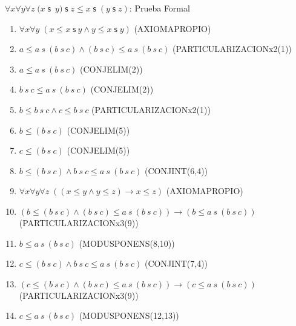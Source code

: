\documentclass[10pt]{beamer}
\newcounter{saveenumi}
\newcommand{\seti}{\setcounter{saveenumi}{\value{enumi}}}
\newcommand{\Cfonta}{\fontsize{6.7}{9.5}\selectfont}
\newcommand{\Nand}{\wedge}
\newcommand{\trans}{\forall x\forall y\forall z\;\left( (x\leq y\wedge
y\leq z)\rightarrow x\leq z\right)}
\newcommand{\sCot}{\forall x\forall y\;(x\leq x\;\mathsf{s}\ y\wedge y\leq x\;\mathsf{s}\;y)}
\newcommand{\assoc}{\forall x\forall y\forall
z\;(x\;\mathsf{s}$\ $y)\;\mathsf{s}\;z\leq x\;\mathsf{s}\;(y\;\mathsf{s}\;z)}
\begin{document}
\begin{frame}{$\assoc$: Prueba Formal}
\Cfonta
  \begin{enumerate}[<+->]
    \item $ \sCot $ \hfill(AXIOMAPROPIO)
    \item $ a \leq a\ s\ (b\ s\ c)\Nand (b\ s\ c)\leq a\ s\ (b\ s\ c) $ \hfill(PARTICULARIZACIONx2(1))
    \item $ a \leq a\ s\ (b\ s\ c)$ \hfill(CONJELIM(2))
    \item $ b\ s\ c \leq a\ s\ (b\ s\ c)$ \hfill(CONJELIM(2))
    \item $ b \leq b\ s\ c \Nand c \leq b\ s\ c $ \hfill(PARTICULARIZACIONx2(1))
    \item $ b \leq (b\ s\ c)$ \hfill(CONJELIM(5))
    \item $ c \leq (b\ s\ c)$ \hfill(CONJELIM(5))
    \item $ b \leq (b\ s\ c) \Nand b\ s\ c \leq a\ s\ (b\ s\ c)$ \hfill(CONJINT(6,4))
    \item $ \trans $ \hfill(AXIOMAPROPIO)
    \item $ (b \leq (b\ s\ c) \Nand (b\ s\ c) \leq a\ s\ (b\ s\ c)) \rightarrow (b \leq a\ s\ (b\ s\ c))$ \hfill(PARTICULARIZACIONx3(9))
    \item $ b \leq a\ s\ (b\ s\ c) $ \hfill(MODUSPONENS(8,10))
    \item $ c \leq (b\ s\ c) \Nand  b\ s\ c \leq a\ s\ (b\ s\ c) $ \hfill(CONJINT(7,4))
    \item $ (c \leq (b\ s\ c) \Nand (b\ s\ c) \leq a\ s\ (b\ s\ c)) \rightarrow (c \leq a\ s\ (b\ s\ c))$ \hfill(PARTICULARIZACIONx3(9))
    \item $ c \leq a\ s\ (b\ s\ c) $ \hfill(MODUSPONENS(12,13))
    \seti
  \end{enumerate}


  \setcounter{equation}{0}

\end{frame}
\end{document}
